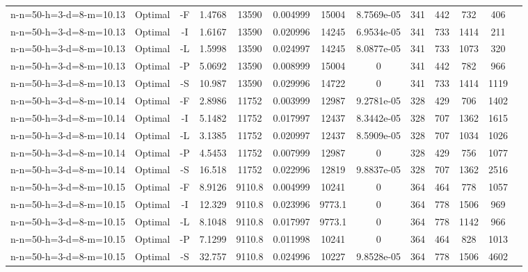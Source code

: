 \documentclass[landscape, a4paper]{article}
\begin{document}
\begin{center}
\begin{tabular}{lcccccccccccc}
n-n=50-h=3-d=8-m=10.13 & Optimal & -F & 1.4768 & 13590 & 0.004999 & 15004 & 8.7569e-05 & 341 & 442 & 732 & 406 & \\
n-n=50-h=3-d=8-m=10.13 & Optimal & -I & 1.6167 & 13590 & 0.020996 & 14245 & 6.9534e-05 & 341 & 733 & 1414 & 211 & \\
n-n=50-h=3-d=8-m=10.13 & Optimal & -L & 1.5998 & 13590 & 0.024997 & 14245 & 8.0877e-05 & 341 & 733 & 1073 & 320 & \\
n-n=50-h=3-d=8-m=10.13 & Optimal & -P & 5.0692 & 13590 & 0.008999 & 15004 & 0 & 341 & 442 & 782 & 966 & \\
n-n=50-h=3-d=8-m=10.13 & Optimal & -S & 10.987 & 13590 & 0.029996 & 14722 & 0 & 341 & 733 & 1414 & 1119 & \\
n-n=50-h=3-d=8-m=10.14 & Optimal & -F & 2.8986 & 11752 & 0.003999 & 12987 & 9.2781e-05 & 328 & 429 & 706 & 1402 & \\
n-n=50-h=3-d=8-m=10.14 & Optimal & -I & 5.1482 & 11752 & 0.017997 & 12437 & 8.3442e-05 & 328 & 707 & 1362 & 1615 & \\
n-n=50-h=3-d=8-m=10.14 & Optimal & -L & 3.1385 & 11752 & 0.020997 & 12437 & 8.5909e-05 & 328 & 707 & 1034 & 1026 & \\
n-n=50-h=3-d=8-m=10.14 & Optimal & -P & 4.5453 & 11752 & 0.007999 & 12987 & 0 & 328 & 429 & 756 & 1077 & \\
n-n=50-h=3-d=8-m=10.14 & Optimal & -S & 16.518 & 11752 & 0.022996 & 12819 & 9.8837e-05 & 328 & 707 & 1362 & 2516 & \\
n-n=50-h=3-d=8-m=10.15 & Optimal & -F & 8.9126 & 9110.8 & 0.004999 & 10241 & 0 & 364 & 464 & 778 & 1057 & \\
n-n=50-h=3-d=8-m=10.15 & Optimal & -I & 12.329 & 9110.8 & 0.023996 & 9773.1 & 0 & 364 & 778 & 1506 & 969 & \\
n-n=50-h=3-d=8-m=10.15 & Optimal & -L & 8.1048 & 9110.8 & 0.017997 & 9773.1 & 0 & 364 & 778 & 1142 & 966 & \\
n-n=50-h=3-d=8-m=10.15 & Optimal & -P & 7.1299 & 9110.8 & 0.011998 & 10241 & 0 & 364 & 464 & 828 & 1013 & \\
n-n=50-h=3-d=8-m=10.15 & Optimal & -S & 32.757 & 9110.8 & 0.024996 & 10227 & 9.8528e-05 & 364 & 778 & 1506 & 4602 & \\
\end{tabular}
\end{center}
\end{document}
